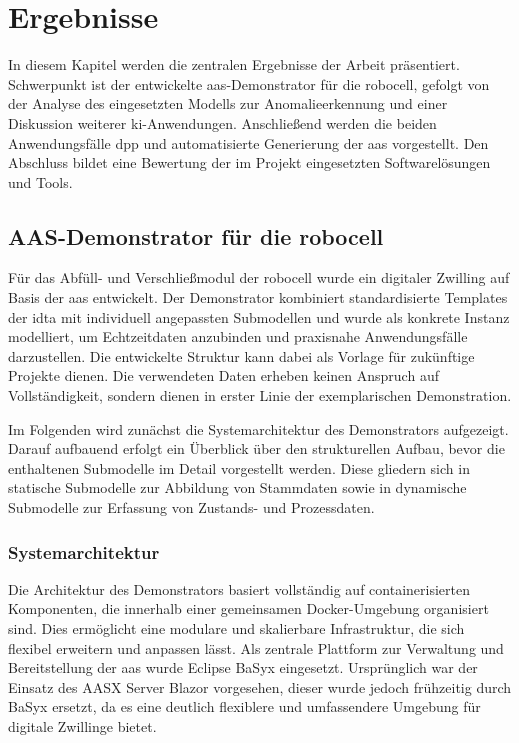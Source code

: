\newpage
\section{Ergebnisse}
In diesem Kapitel werden die zentralen Ergebnisse der Arbeit präsentiert. 
Schwerpunkt ist der entwickelte \acs{aas}-Demonstrator für die robocell, gefolgt von der Analyse des eingesetzten Modells zur Anomalieerkennung und einer Diskussion weiterer \acs{ki}-Anwendungen. 
Anschließend werden die beiden Anwendungsfälle \acs{dpp} und automatisierte Generierung der \acs{aas} vorgestellt. 
Den Abschluss bildet eine Bewertung der im Projekt eingesetzten Softwarelösungen und Tools.

\subsection{AAS-Demonstrator für die robocell}
Für das Abfüll- und Verschließmodul der robocell wurde ein digitaler Zwilling auf Basis der \acs{aas} entwickelt.  
Der Demonstrator kombiniert standardisierte Templates der \acs{idta} mit individuell angepassten Submodellen und wurde als konkrete Instanz modelliert, um Echtzeitdaten anzubinden und praxisnahe Anwendungsfälle darzustellen.
Die entwickelte Struktur kann dabei als Vorlage für zukünftige Projekte dienen.  
Die verwendeten Daten erheben keinen Anspruch auf Vollständigkeit, sondern dienen in erster Linie der exemplarischen Demonstration.

Im Folgenden wird zunächst die Systemarchitektur des Demonstrators aufgezeigt.  
Darauf aufbauend erfolgt ein Überblick über den strukturellen Aufbau, bevor die enthaltenen Submodelle im Detail vorgestellt werden.  
Diese gliedern sich in statische Submodelle zur Abbildung von Stammdaten sowie in dynamische Submodelle zur Erfassung von Zustands- und Prozessdaten.

\subsubsection{Systemarchitektur}
Die Architektur des Demonstrators basiert vollständig auf containerisierten Komponenten, die innerhalb einer gemeinsamen Docker-Umgebung organisiert sind.
Dies ermöglicht eine modulare und skalierbare Infrastruktur, die sich flexibel erweitern und anpassen lässt.
Als zentrale Plattform zur Verwaltung und Bereitstellung der \acs{aas} wurde Eclipse BaSyx eingesetzt.
Ursprünglich war der Einsatz des AASX Server Blazor vorgesehen, dieser wurde jedoch frühzeitig durch BaSyx ersetzt, da es eine deutlich flexiblere und umfassendere Umgebung für digitale Zwillinge bietet.

